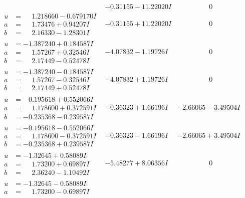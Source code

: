 \documentclass[1p]{elsarticle_modified}
\theoremstyle{definition}
\begin{document}
$$\begin{array}{c|c|c}
 & -0.31155 - 11.22020 I & \phantom{-0.000000 } 0 \\ \hline\begin{aligned}
u &= \phantom{-}1.218660 - 0.679170 I \\
a &= \phantom{-}1.73476 + 0.94207 I \\
b &= \phantom{-}2.16330 - 1.28301 I\end{aligned}
 & -0.31155 + 11.22020 I & \phantom{-0.000000 } 0 \\ \hline\begin{aligned}
u &= -1.387240 + 0.184587 I \\
a &= \phantom{-}1.57267 + 0.32546 I \\
b &= \phantom{-}2.17449 - 0.52478 I\end{aligned}
 & -4.07832 - 1.19726 I & \phantom{-0.000000 } 0 \\ \hline\begin{aligned}
u &= -1.387240 - 0.184587 I \\
a &= \phantom{-}1.57267 - 0.32546 I \\
b &= \phantom{-}2.17449 + 0.52478 I\end{aligned}
 & -4.07832 + 1.19726 I & \phantom{-0.000000 } 0 \\ \hline\begin{aligned}
u &= -0.195618 + 0.552066 I \\
a &= \phantom{-}1.178600 + 0.372591 I \\
b &= -0.235368 - 0.239587 I\end{aligned}
 & -0.36323 + 1.66196 I & -2.66065 - 3.49504 I \\ \hline\begin{aligned}
u &= -0.195618 - 0.552066 I \\
a &= \phantom{-}1.178600 - 0.372591 I \\
b &= -0.235368 + 0.239587 I\end{aligned}
 & -0.36323 - 1.66196 I & -2.66065 + 3.49504 I \\ \hline\begin{aligned}
u &= -1.32645 + 0.58089 I \\
a &= \phantom{-}1.73200 + 0.69897 I \\
b &= \phantom{-}2.36240 - 1.10492 I\end{aligned}
 & -5.48277 + 8.06356 I & \phantom{-0.000000 } 0 \\ \hline\begin{aligned}
u &= -1.32645 - 0.58089 I \\
a &= \phantom{-}1.73200 - 0.69897 I \\

\end{aligned}
\end{array}$$
\end{document}
